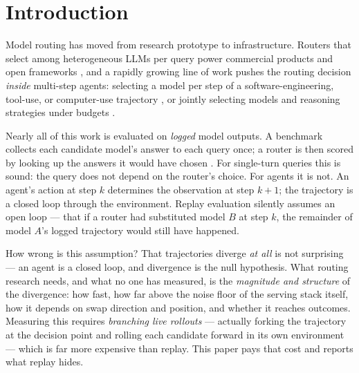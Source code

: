 \documentclass{article}
\begin{document}
\section{Introduction}

Model routing has moved from research prototype to infrastructure. Routers that select among heterogeneous LLMs per query power commercial products and open frameworks \citep{ong2024routellm,chen2023frugalgpt,hu2024routerbench}, and a rapidly growing line of work pushes the routing decision \emph{inside} multi-step agents: selecting a model per step of a software-engineering, tool-use, or computer-use trajectory \citep{vllm2026saar,switchcraft2026,cua2026steplevel}, or jointly selecting models and reasoning strategies under budgets \citep{pan2025rtr}.

Nearly all of this work is evaluated on \emph{logged} model outputs. A benchmark collects each candidate model's answer to each query once; a router is then scored by looking up the answers it would have chosen \citep{hu2024routerbench,huang2025routereval,routerarena2025}. For single-turn queries this is sound: the query does not depend on the router's choice. For agents it is not. An agent's action at step $k$ determines the observation at step $k{+}1$; the trajectory is a closed loop through the environment. Replay evaluation silently assumes an open loop --- that if a router had substituted model $B$ at step $k$, the remainder of model $A$'s logged trajectory would still have happened.

How wrong is this assumption? That trajectories diverge \emph{at all} is not surprising --- an agent is a closed loop, and divergence is the null hypothesis. What routing research needs, and what no one has measured, is the \emph{magnitude and structure} of the divergence: how fast, how far above the noise floor of the serving stack itself, how it depends on swap direction and position, and whether it reaches outcomes. Measuring this requires \emph{branching live rollouts} --- actually forking the trajectory at the decision point and rolling each candidate forward in its own environment --- which is far more expensive than replay. This paper pays that cost and reports what replay hides.
\end{document}
